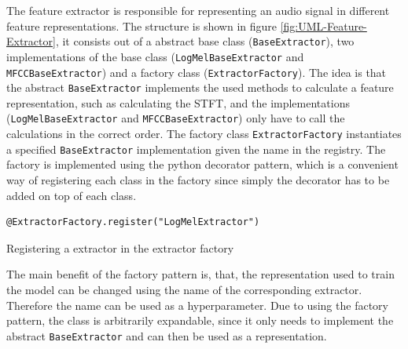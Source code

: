 \noindent
The feature extractor is responsible for representing an audio signal in different feature representations. The structure is shown in figure \ref{fig:UML-Feature-Extractor}, it consists out of a abstract base class (\texttt{BaseExtractor}), two implementations of the base class (\texttt{LogMelBaseExtractor} and \texttt{MFCCBaseExtractor}) and a factory class (\texttt{ExtractorFactory}). The idea is that the abstract \texttt{BaseExtractor} implements the used methods to calculate a feature representation, such as calculating the \gls{STFT}, and the implementations (\texttt{LogMelBaseExtractor} and \texttt{MFCCBaseExtractor}) only have to call the calculations in the correct order. The factory class \texttt{ExtractorFactory} instantiates a specified \texttt{BaseExtractor} implementation given the name in the registry. The factory is implemented using the python decorator pattern, which is a convenient way of registering each class in the factory since simply the decorator has to be added on top of each class.

\begin{code}[htbp]
\begin{verbatim}
@ExtractorFactory.register("LogMelExtractor")
\end{verbatim}
\caption{Registering a extractor in the extractor factory}
\label{code:Extractor-Factory}
\end{code}
\noindent
The main benefit of the factory pattern is, that, the representation used to train the model can be changed using the name of the corresponding extractor. Therefore the name can be used as a hyperparameter. Due to using the factory pattern, the class is arbitrarily expandable, since it only needs to implement the abstract \texttt{BaseExtractor} and can then be used as a representation.

